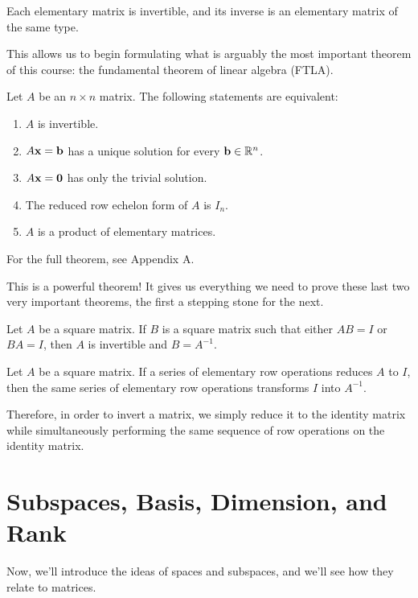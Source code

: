 \documentclass[../m073main.tex]{subfiles}
\begin{document}
\begin{theorem}
	Each elementary matrix is invertible, and its inverse is an elementary matrix of the same type.
\end{theorem}

This allows us to begin formulating what is arguably the most important theorem of this course: the fundamental theorem of linear algebra (FTLA).

\begin{theorem}
	Let $A$ be an $n\times n$ matrix.
	The following statements are equivalent:
	\begin{enumerate}[label=(\alph*)]
		\item $A$ is invertible.
		\item $A\mathbf{x}= \mathbf{b}$ has a unique solution for every $\mathbf{b}\in\mathbb{R}^n$.
		\item $A\mathbf{x}=\mathbf{0}$ has only the trivial solution.
		\item The reduced row echelon form of $A$ is $I_n$.
		\item $A$ is a product of elementary matrices.
	\end{enumerate}
	For the full theorem, see Appendix A.
\end{theorem}

This is a powerful theorem!
It gives us everything we need to prove these last two very important theorems, the first a stepping stone for the next.

\pagebreak

\begin{theorem}
	Let $A$ be a square matrix.
	If $B$ is a square matrix such that either $AB = I$ or $BA = I$, then $A$ is invertible and $B = A^{-1}$.
\end{theorem}

\begin{theorem}
	Let $A$ be a square matrix.
	If a series of elementary row operations reduces $A$ to $I$, then the same series of elementary row operations transforms $I$ into $A^{-1}$.
\end{theorem}

Therefore, in order to invert a matrix, we simply reduce it to the identity matrix while simultaneously performing the same sequence of row operations on the identity matrix.

\section{Subspaces, Basis, Dimension, and Rank}
Now, we'll introduce the ideas of spaces and subspaces, and we'll see how they relate to matrices.
\end{document}
